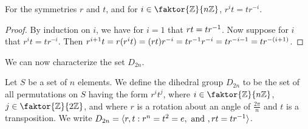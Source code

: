 \begin{proposition}\label{proposition_1.2.1}
  For the symmetries $r$ and  $t$, and for  $i \in \faktor{\Z}{n\Z}$,
  $r^it=tr^{-i}$.
\end{proposition}
\begin{proof}
  By induction on $i$, we have for  $i=1$ that  $rt=tr^{-1}$. Now suppose for
  $i$ that  $r^it=tr^{-i}$. Then
  $r^{i+1}t=r(r^it)=(rt)r^{-i}=tr^{-1}r^{-i}=tr^{-i-1}=tr^{-(i+1)}$.
\end{proof}

We can now characterize the set $D_{2n}$.

\begin{definition}
  Let $S$ be a set of $n$ elements. We define the dihedral group
  $D_{2n}$ to be the set of all permutations on $S$ having the form $r^it^j$, where
  $i \in \faktor{\Z}{n\Z}$, $j \in \faktor{\Z}{2\Z}$, and where $r$ is
  a rotation about an angle of $\frac{2\pi}{n}$ and $t$ is a
  transposition. We write $D_{2n}=\langle r,t : r^n=t^2=e, \text{ and }, rt=tr^{-1}
  \rangle$.
\end{definition}

